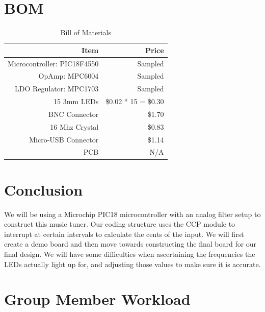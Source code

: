\documentclass[12pt]{article}
\begin{document}
\section{BOM}
\begin{table}[!h]
   \centering
    \begin{tabular}{|r|r|}
        \hline
	Item & Price \\ \hline
	Microcontroller: PIC18F4550 & Sampled \\ \hline
	OpAmp: MPC6004 & Sampled \\ \hline
	LDO Regulator: MPC1703 & Sampled \\ \hline
	15 3mm  LEDs & \$0.02 * 15 = \$0.30 \\ \hline
	BNC Connector & \$1.70 \\ \hline
	16 Mhz Crystal & \$0.83 \\ \hline
	Micro-USB Connector & \$1.14 \\ \hline
	PCB & N/A \\ \hline
	
    \end{tabular}
	\caption{Bill of Materials}
	\label{bom} 
\end{table}


\section{Conclusion}
We will be using a Microchip PIC18 microcontroller with an analog filter setup to
construct this music tuner. Our coding structure uses the CCP module to interrupt at
certain intervals to calculate the cents of the input. We will first create a demo board
and then move towards constructing the final board for our final design. We will have some
difficulties when ascertaining the frequencies the LEDs actually light up for, and adjusting those values
to make sure it is accurate.

\section{Group Member Workload}
\end{document}
